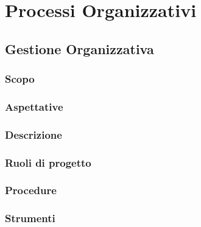 \section{Processi Organizzativi}
\subsection{Gestione Organizzativa}
\subsubsection{Scopo}
\subsubsection{Aspettative}
\subsubsection{Descrizione}
\subsubsection{Ruoli di progetto}
\subsubsection{Procedure}
\subsubsection{Strumenti}